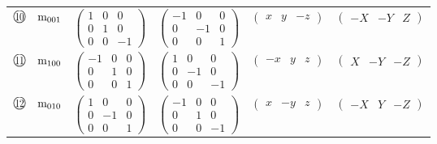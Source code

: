 \documentclass[fleqn,10pt,landscape]{jsarticle}
\begin{document}
\begin{center}
\begin{longtable}{lcccc}
$ {\ooalign{\hfil\resizebox{.8\width}{\height}{10}\hfil\crcr\raise.1ex\hbox{\large$\bigcirc$}}}\quad {\rm m}_{001} $ & $ \begin{pmatrix} 1 & 0 & 0 \\ 0 & 1 & 0 \\ 0 & 0 & -1 \end{pmatrix} $ & $ \begin{pmatrix} -1 & 0 & 0 \\ 0 & -1 & 0 \\ 0 & 0 & 1 \end{pmatrix} $ & $ \begin{pmatrix} x & y & - z \end{pmatrix} $ & $ \begin{pmatrix} - X & - Y & Z \end{pmatrix} $ \\
$ {\ooalign{\hfil\resizebox{.8\width}{\height}{11}\hfil\crcr\raise.1ex\hbox{\large$\bigcirc$}}}\quad {\rm m}_{100} $ & $ \begin{pmatrix} -1 & 0 & 0 \\ 0 & 1 & 0 \\ 0 & 0 & 1 \end{pmatrix} $ & $ \begin{pmatrix} 1 & 0 & 0 \\ 0 & -1 & 0 \\ 0 & 0 & -1 \end{pmatrix} $ & $ \begin{pmatrix} - x & y & z \end{pmatrix} $ & $ \begin{pmatrix} X & - Y & - Z \end{pmatrix} $ \\
$ {\ooalign{\hfil\resizebox{.8\width}{\height}{12}\hfil\crcr\raise.1ex\hbox{\large$\bigcirc$}}}\quad {\rm m}_{010} $ & $ \begin{pmatrix} 1 & 0 & 0 \\ 0 & -1 & 0 \\ 0 & 0 & 1 \end{pmatrix} $ & $ \begin{pmatrix} -1 & 0 & 0 \\ 0 & 1 & 0 \\ 0 & 0 & -1 \end{pmatrix} $ & $ \begin{pmatrix} x & - y & z \end{pmatrix} $ & $ \begin{pmatrix} - X & Y & - Z \end{pmatrix} $ \\

\end{longtable}
\end{center}
\end{document}
